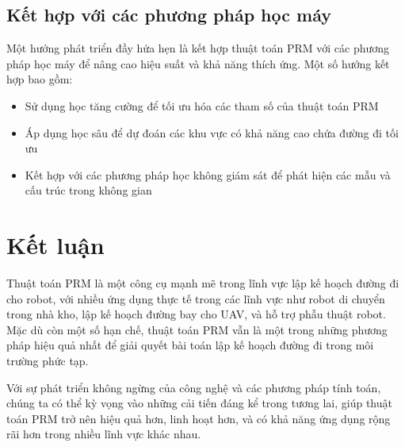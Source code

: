 \documentclass[12pt,a4paper,openany,oneside]{report}
\begin{document}
\subsection{Kết hợp với các phương pháp học máy}

Một hướng phát triển đầy hứa hẹn là kết hợp thuật toán PRM với các phương pháp học máy để nâng cao hiệu suất và khả năng thích ứng. Một số hướng kết hợp bao gồm:

\begin{itemize}
    \item Sử dụng học tăng cường để tối ưu hóa các tham số của thuật toán PRM
    \item Áp dụng học sâu để dự đoán các khu vực có khả năng cao chứa đường đi tối ưu
    \item Kết hợp với các phương pháp học không giám sát để phát hiện các mẫu và cấu trúc trong không gian
\end{itemize}

\section{Kết luận}

Thuật toán PRM là một công cụ mạnh mẽ trong lĩnh vực lập kế hoạch đường đi cho robot, với nhiều ứng dụng thực tế trong các lĩnh vực như robot di chuyển trong nhà kho, lập kế hoạch đường bay cho UAV, và hỗ trợ phẫu thuật robot. Mặc dù còn một số hạn chế, thuật toán PRM vẫn là một trong những phương pháp hiệu quả nhất để giải quyết bài toán lập kế hoạch đường đi trong môi trường phức tạp.

Với sự phát triển không ngừng của công nghệ và các phương pháp tính toán, chúng ta có thể kỳ vọng vào những cải tiến đáng kể trong tương lai, giúp thuật toán PRM trở nên hiệu quả hơn, linh hoạt hơn, và có khả năng ứng dụng rộng rãi hơn trong nhiều lĩnh vực khác nhau.
\end{document}
